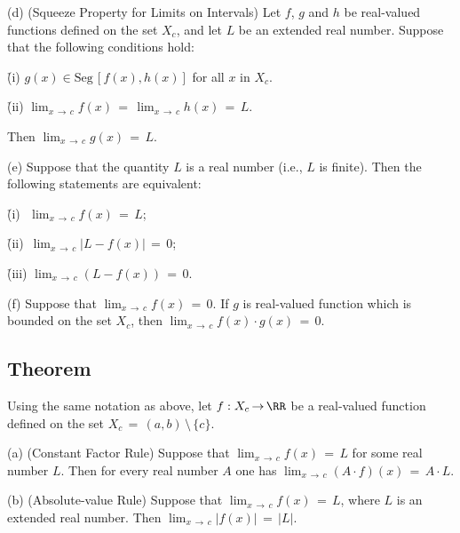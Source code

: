 \V

        (d) (Squeeze Property for Limits on Intervals) Let $f$, $g$ and $h$ be real-valued functions defined on the set $X_{c}$,
    and let $L$ be an extended real number. Suppose that the following conditions hold:

        \h (i) $g(x){\in}\mbox{Seg}\,[f(x),h(x)]$ for all $x$ in $X_{c}$.

        \h (ii) ${\displaystyle \lim_{x \,{\rightarrow}\, c} f(x)
     \,=\, \lim_{x \,{\rightarrow}\, c} h(x) \,=\, L}$.

    Then ${\displaystyle \lim_{x \,{\rightarrow}\, c} g(x) \,=\, L}$.

\V

        (e) Suppose that the quantity $L$ is a real number (i.e., $L$ is finite).
    Then the following statements are equivalent:

        \h (i)\,\, ${\displaystyle \lim_{x \,{\rightarrow}\, c} f(x) \,=\, L}$;

        \h (ii)\, ${\displaystyle \lim_{x \,{\rightarrow}\, c} |L-f(x)| \,=\, 0}$;

        \h (iii) ${\displaystyle \lim_{x \,{\rightarrow}\, c} (L-f(x)) \,=\, 0}$.

\V

        (f) Suppose that ${\displaystyle \lim_{x \,{\rightarrow}\, c} f(x) \,=\, 0}$.
    If $g$ is real-valued function which is bounded on the set $X_{c}$, then ${\displaystyle \lim_{x \,{\rightarrow}\, c} f(x){\cdot}g(x) \,=\, 0}$.

\VV

            \subsection{\small{\bf Theorem}}
            \label{ThmC90.60}

\V

        Using the same notation as above, let $f:X_{c} \,{\rightarrow}\, {\RR}$ be a real-valued function defined on the set $X_{c} \,=\, (a,b)\,{\setminus}\,\{c\}$.

\V

        (a) (Constant Factor Rule) Suppose that ${\displaystyle \lim_{x \,{\rightarrow}\, c} f(x) \,=\, L}$ for some real number $L$.
    Then for every real number $A$ one has ${\displaystyle \lim_{x \,{\rightarrow}\, c} (A{\cdot}f)(x) \,=\, A{\cdot}L}$.

\V

        (b) (Absolute-value Rule) Suppose that ${\displaystyle \lim_{x \,{\rightarrow}\, c}} f(x) \,=\, L$, where $L$ is an extended real number.
    Then ${\displaystyle \lim_{x \,{\rightarrow}\, c}} |f(x)| \,=\, |L|$.

